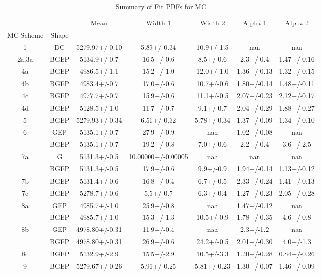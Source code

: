 \begin{table}[h]
\centering
\caption{Summary of Fit PDFs for MC}
\label{tab:mcfits_1}
\begin{tabular}{ccccccc}
\toprule
 &  & Mean & Width 1 & Width 2 & Alpha 1 & Alpha 2 \\
MC Scheme & Shape &  &  &  &  &  \\
\midrule
1 & DG & 5279.97+/-0.10 & 5.89+/-0.34 & 10.9+/-1.5 & nan & nan \\
2a,3a & BGEP & 5134.9+/-0.7 & 16.5+/-0.6 & 8.5+/-0.6 & 2.3+/-0.4 & 1.47+/-0.16 \\
4a & BGEP & 4986.5+/-1.1 & 15.2+/-1.0 & 12.0+/-1.0 & 1.36+/-0.13 & 1.32+/-0.15 \\
4b & BGEP & 4983.4+/-0.7 & 17.0+/-0.6 & 10.7+/-0.6 & 1.80+/-0.14 & 1.48+/-0.11 \\
4c & BGEP & 4977.7+/-0.7 & 15.9+/-0.6 & 11.1+/-0.5 & 2.07+/-0.23 & 2.12+/-0.17 \\
4d & BGEP & 5128.5+/-1.0 & 11.7+/-0.7 & 9.1+/-0.7 & 2.04+/-0.29 & 1.88+/-0.27 \\
5 & BGEP & 5279.93+/-0.34 & 6.51+/-0.32 & 5.78+/-0.34 & 1.37+/-0.09 & 1.34+/-0.10 \\
\multirow[t]{2}{*}{6} & GEP & 5135.1+/-0.7 & 27.9+/-0.9 & nan & 1.02+/-0.08 & nan \\
 & BGEP & 5135.1+/-0.7 & 19.2+/-0.8 & 7.0+/-0.6 & 2.2+/-0.4 & 3.6+/-2.5 \\
\multirow[t]{2}{*}{7a} & G & 5131.3+/-0.5 & 10.00000+/-0.00005 & nan & nan & nan \\
 & BGEP & 5131.3+/-0.5 & 17.9+/-0.6 & 9.9+/-0.9 & 1.94+/-0.14 & 1.13+/-0.12 \\
7b & BGEP & 5131.4+/-0.6 & 16.8+/-0.4 & 6.7+/-0.5 & 2.33+/-0.24 & 1.41+/-0.13 \\
7c & BGEP & 5278.7+/-0.6 & 5.5+/-0.7 & 6.3+/-0.4 & 1.27+/-0.23 & 2.05+/-0.28 \\
\multirow[t]{2}{*}{8a} & GEP & 4985.7+/-1.0 & 25.9+/-0.8 & nan & 1.47+/-0.12 & nan \\
 & BGEP & 4985.7+/-1.0 & 15.3+/-1.3 & 10.5+/-0.9 & 1.78+/-0.35 & 4.6+/-0.8 \\
\multirow[t]{2}{*}{8b} & GEP & 4978.80+/-0.31 & 11.9+/-0.4 & nan & 2.3+/-1.2 & nan \\
 & BGEP & 4978.80+/-0.31 & 26.9+/-0.6 & 24.2+/-0.5 & 2.01+/-0.30 & 4.0+/-1.3 \\
8c & BGEP & 5132.9+/-2.9 & 15.5+/-2.9 & 10.5+/-3.3 & 1.20+/-0.28 & 0.84+/-0.26 \\
9 & BGEP & 5279.67+/-0.26 & 5.96+/-0.25 & 5.81+/-0.23 & 1.30+/-0.07 & 1.46+/-0.09 \\

\end{tabular}
\end{table}
